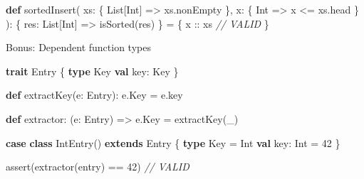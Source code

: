 \documentclass[
  ignorenonframetext,
]{beamer}
\newenvironment{Shaded}{}{}
\newcommand{\CommentTok}[1]{\textcolor[rgb]{0.38,0.63,0.69}{\textit{#1}}}
\newcommand{\DecValTok}[1]{\textcolor[rgb]{0.25,0.63,0.44}{#1}}
\newcommand{\FunctionTok}[1]{\textcolor[rgb]{0.02,0.16,0.49}{#1}}
\newcommand{\KeywordTok}[1]{\textcolor[rgb]{0.00,0.44,0.13}{\textbf{#1}}}
\newcommand{\NormalTok}[1]{#1}
\begin{document}
\begin{frame}[fragile]

\begin{Shaded}
\begin{Highlighting}[]
\KeywordTok{def} \FunctionTok{sortedInsert}\NormalTok{(}
\NormalTok{  xs: \{ List[Int] => xs.}\FunctionTok{nonEmpty}\NormalTok{ \},}
\NormalTok{  x:  \{ Int => x <= xs.}\FunctionTok{head}\NormalTok{ \}}
\NormalTok{): \{ res: List[Int] => }\FunctionTok{isSorted}\NormalTok{(res) \} = \{}
\NormalTok{  x :: xs }\CommentTok{// VALID}
\NormalTok{\}}
\end{Highlighting}
\end{Shaded}

\end{frame}

\begin{frame}[fragile]{Bonus: Dependent function types}
\protect\hypertarget{bonus-dependent-function-types}{}

\begin{Shaded}
\begin{Highlighting}[]
\KeywordTok{trait}\NormalTok{ Entry \{}
  \KeywordTok{type}\NormalTok{ Key}
  \KeywordTok{val}\NormalTok{ key: Key}
\NormalTok{\}}

\KeywordTok{def} \FunctionTok{extractKey}\NormalTok{(e: Entry): e.}\FunctionTok{Key}\NormalTok{ = e.}\FunctionTok{key}

\KeywordTok{def}\NormalTok{ extractor: (e: Entry) => e.}\FunctionTok{Key}\NormalTok{ = }\FunctionTok{extractKey}\NormalTok{(_)}
\end{Highlighting}
\end{Shaded}

\end{frame}

\begin{frame}[fragile]

\begin{Shaded}
\begin{Highlighting}[]
\KeywordTok{case} \KeywordTok{class} \FunctionTok{IntEntry}\NormalTok{() }\KeywordTok{extends}\NormalTok{ Entry \{}
  \KeywordTok{type}\NormalTok{ Key = Int}
  \KeywordTok{val}\NormalTok{ key: Int = }\DecValTok{42}
\NormalTok{\}}

\FunctionTok{assert}\NormalTok{(}\FunctionTok{extractor}\NormalTok{(entry) == }\DecValTok{42}\NormalTok{) }\CommentTok{// VALID}
\end{Highlighting}
\end{Shaded}

\end{frame}
\end{document}
